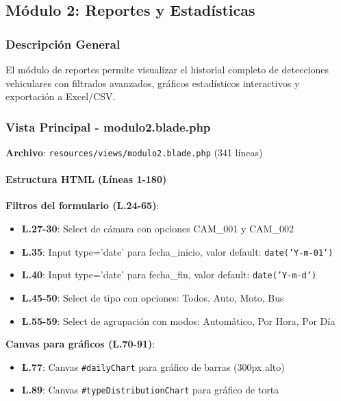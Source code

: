 \subsection{Módulo 2: Reportes y Estadísticas}

\subsubsection{Descripción General}

El módulo de reportes permite visualizar el historial completo de detecciones vehiculares con filtrados avanzados, gráficos estadísticos interactivos y exportación a Excel/CSV.

\subsubsection{Vista Principal - modulo2.blade.php}

\textbf{Archivo}: \texttt{resources/views/modulo2.blade.php} (341 líneas)

\paragraph{Estructura HTML (Líneas 1-180)}

\textbf{Filtros del formulario (L.24-65)}:
\begin{itemize}
    \item \textbf{L.27-30}: Select de cámara con opciones CAM\_001 y CAM\_002
    \item \textbf{L.35}: Input type='date' para fecha\_inicio, valor default: \texttt{date('Y-m-01')}
    \item \textbf{L.40}: Input type='date' para fecha\_fin, valor default: \texttt{date('Y-m-d')}
    \item \textbf{L.45-50}: Select de tipo con opciones: Todos, Auto, Moto, Bus
    \item \textbf{L.55-59}: Select de agrupación con modos: Automático, Por Hora, Por Día
\end{itemize}

\textbf{Canvas para gráficos (L.70-91)}:
\begin{itemize}
    \item \textbf{L.77}: Canvas \texttt{\#dailyChart} para gráfico de barras (300px alto)
    \item \textbf{L.89}: Canvas \texttt{\#typeDistributionChart} para gráfico de torta
\end{itemize}

